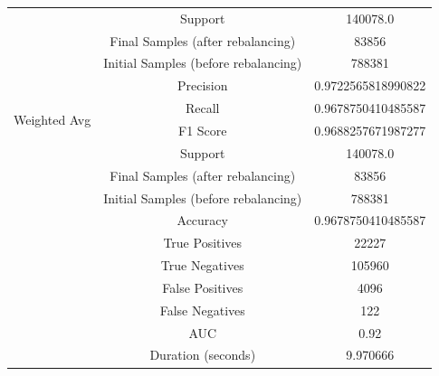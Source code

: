 \begin{longtable}{|c|c|c|}
 & Support & 140078.0 \\
 & Final Samples (after rebalancing) & 83856 \\
 & Initial Samples (before rebalancing) & 788381 \\
\hline
\multirow{4}{*}{Weighted Avg} & Precision & 0.9722565818990822 \\
 & Recall & 0.9678750410485587 \\
 & F1 Score & 0.9688257671987277 \\
 & Support & 140078.0 \\
 & Final Samples (after rebalancing) & 83856 \\
 & Initial Samples (before rebalancing) & 788381 \\
\hline
& Accuracy & 0.9678750410485587 \\ \hline
& True Positives & 22227 \\ \hline
& True Negatives & 105960 \\ \hline
& False Positives & 4096 \\ \hline
& False Negatives & 122 \\ \hline
& AUC & 0.92 \\ \hline
& Duration (seconds) & 9.970666 \\ \hline
\end{longtable}


